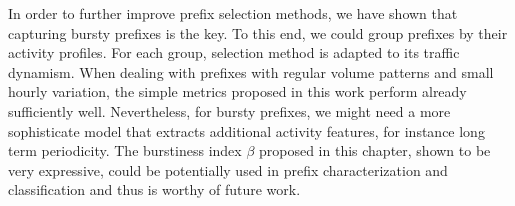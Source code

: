 In order to further improve prefix selection methods, we have shown that capturing bursty prefixes is the key. 
To this end, we could group prefixes by their activity profiles. 
For each group, selection method is adapted to its traffic dynamism.
When dealing with prefixes with regular volume patterns and small hourly variation, the simple metrics proposed in this work perform already sufficiently well. 
Nevertheless, for bursty prefixes, we might need a more sophisticate model that extracts additional activity features, for instance long term periodicity.
The burstiness index $\beta$ proposed in this chapter, shown to be very expressive, could be potentially used in prefix characterization and classification and thus is worthy of future work.